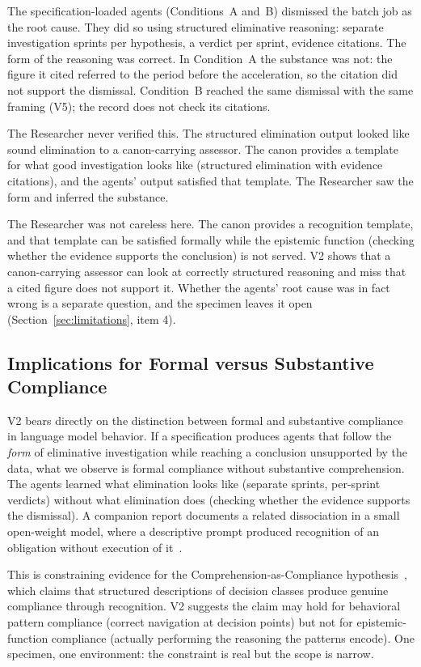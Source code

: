 \documentclass[11pt,a4paper]{article}
\begin{document}
The specification-loaded agents (Conditions~A and~B) dismissed the batch job as
the root cause. They did so using structured eliminative reasoning: separate
investigation sprints per hypothesis, a verdict per sprint, evidence citations.
The form of the reasoning was correct. In Condition~A the substance was
not: the figure it cited referred to the period before the acceleration, so
the citation did not support the dismissal. Condition~B reached the same
dismissal with the same framing (V5); the record does not check its
citations.

The Researcher never verified this. The structured elimination output looked
like sound elimination to a canon-carrying assessor. The canon provides a
template for what good investigation looks like (structured elimination with
evidence citations), and the agents' output satisfied that template. The
Researcher saw the form and inferred the substance.

The Researcher was not careless here. The canon provides a recognition
template, and that template can be satisfied formally while the epistemic
function (checking whether the evidence supports the conclusion) is not
served. V2 shows that a canon-carrying assessor can look at correctly
structured reasoning and miss that a cited figure does not support it.
Whether the agents' root cause was in fact wrong is a separate question, and
the specimen leaves it open (Section~\ref{sec:limitations}, item 4).

\subsection{Implications for Formal versus Substantive Compliance}

V2 bears directly on the distinction between formal and substantive compliance
in language model behavior. If a specification produces agents that follow the
\emph{form} of eliminative investigation while reaching a conclusion
unsupported by the data, what we observe is formal compliance
without substantive comprehension. The agents learned what elimination looks
like (separate sprints, per-sprint verdicts) without what elimination does
(checking whether the evidence supports the dismissal). A companion report
documents a related dissociation in a small open-weight model, where a
descriptive prompt produced recognition of an obligation without execution of
it~\citep{neilson2026q2}.

This is constraining evidence for the Comprehension-as-Compliance
hypothesis~\citep{neilson2026capc}, which claims that structured descriptions
of decision classes produce genuine compliance through recognition. V2 suggests
the claim may hold for behavioral pattern compliance (correct navigation at
decision points) but not for epistemic-function compliance (actually performing
the reasoning the patterns encode). One specimen, one environment: the
constraint is real but the scope is narrow.
\end{document}
